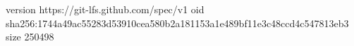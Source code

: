version https://git-lfs.github.com/spec/v1
oid sha256:1744a49ac55283d53910cea580b2a181153a1e489bf11e3c48ccd4c547813eb3
size 250498

